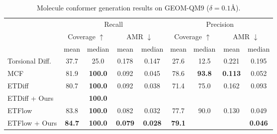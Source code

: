 \begin{table*}[ht!]
    \caption{Molecule conformer generation results on GEOM-QM9 ($\delta = 0.1\text{\AA}$).}
    \label{tab:qm9}
    \centering
    \renewcommand{\arraystretch}{1.1} %
    \begin{tabular}{lcccccccc}
    \toprule
     & \multicolumn{4}{c}{Recall} & \multicolumn{4}{c}{Precision} \\
     & \multicolumn{2}{c}{Coverage $\uparrow$} & \multicolumn{2}{c}{AMR $\downarrow$} & \multicolumn{2}{c}{Coverage $\uparrow$} & \multicolumn{2}{c}{AMR $\downarrow$} \\
        \hline
        & mean & median & mean & median & mean & median & mean & median\\
        \hline
        Torsional Diff. & 37.7 & 25.0 & 0.178 & 0.147 & 27.6 & 12.5 & 0.221 & 0.195 \\
        MCF             & 81.9 & \textbf{100.0} & 0.092 & 0.045 & 78.6 & \textbf{93.8} & \textbf{0.113} & {0.052} \\
        \hline
        ETDiff          & 80.7 & \textbf{100.0} & 0.092 & 0.038 & 71.4 & 75.0 & 0.162 & 0.093 \\
        \cellcolor[HTML]{D3D3D3}ETDiff + Ours   & \cellcolor[HTML]{D3D3D3}{81.0} & \cellcolor[HTML]{D3D3D3}\textbf{100.0} & \cellcolor[HTML]{D3D3D3}{0.089} & \cellcolor[HTML]{D3D3D3}\cellcolor[HTML]{D3D3D3}{0.037} & \cellcolor[HTML]{D3D3D3}{72.2} & \cellcolor[HTML]{D3D3D3}{80.0} & \cellcolor[HTML]{D3D3D3}{0.151} & \cellcolor[HTML]{D3D3D3}{0.077} \\
        \hline
        ETFlow          & 83.8 & \textbf{100.0} & 0.082 & 0.032 & 77.7 & 90.0 & 0.130 & 0.049 \\
        \cellcolor[HTML]{D3D3D3}ETFlow + Ours   & \cellcolor[HTML]{D3D3D3}\textbf{84.7} & \cellcolor[HTML]{D3D3D3}\textbf{100.0} & \cellcolor[HTML]{D3D3D3}\textbf{0.079} & \cellcolor[HTML]{D3D3D3}\textbf{0.028} & \cellcolor[HTML]{D3D3D3}\textbf{79.1} & \cellcolor[HTML]{D3D3D3}{92.5} & \cellcolor[HTML]{D3D3D3}{0.122} & \cellcolor[HTML]{D3D3D3}\textbf{0.046} \\
        \bottomrule
    \end{tabular}
\end{table*}